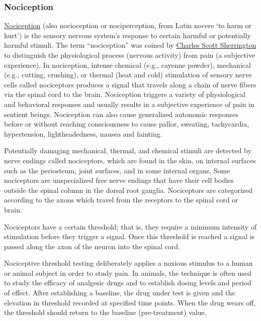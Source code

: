 \hypertarget{nociception}{%
\subsubsection{Nociception}\label{nociception}}

\href{https://en.wikipedia.org/wiki/Nociception}{Nociception} (also
nocioception or nociperception, from Latin nocere `to harm or hurt') is
the sensory nervous system's response to certain harmful or potentially
harmful stimuli. The term ``nociception'' was coined by
\href{https://en.wikipedia.org/wiki/Charles_Scott_Sherrington}{Charles
Scott Sherrington} to distinguish the physiological process (nervous
activity) from pain (a subjective experience). In nociception, intense
chemical (e.g., cayenne powder), mechanical (e.g., cutting, crushing),
or thermal (heat and cold) stimulation of sensory nerve cells called
nociceptors produces a signal that travels along a chain of nerve fibers
via the spinal cord to the brain. Nociception triggers a variety of
physiological and behavioral responses and usually results in a
subjective experience of pain in sentient beings. Nociception can also
cause generalized autonomic responses before or without reaching
consciousness to cause pallor, sweating, tachycardia, hypertension,
lightheadedness, nausea and fainting.

Potentially damaging mechanical, thermal, and chemical stimuli are
detected by nerve endings called nociceptors, which are found in the
skin, on internal surfaces such as the periosteum, joint surfaces, and
in some internal organs. Some nociceptors are unspecialized free nerve
endings that have their cell bodies outside the spinal column in the
dorsal root ganglia. Nociceptors are categorized according to the axons
which travel from the receptors to the spinal cord or brain.

Nociceptors have a certain threshold; that is, they require a minimum
intensity of stimulation before they trigger a signal. Once this
threshold is reached a signal is passed along the axon of the neuron
into the spinal cord.

Nociceptive threshold testing deliberately applies a noxious stimulus to
a human or animal subject in order to study pain. In animals, the
technique is often used to study the efficacy of analgesic drugs and to
establish dosing levels and period of effect. After establishing a
baseline, the drug under test is given and the elevation in threshold
recorded at specified time points. When the drug wears off, the
threshold should return to the baseline (pre-treatment) value.

